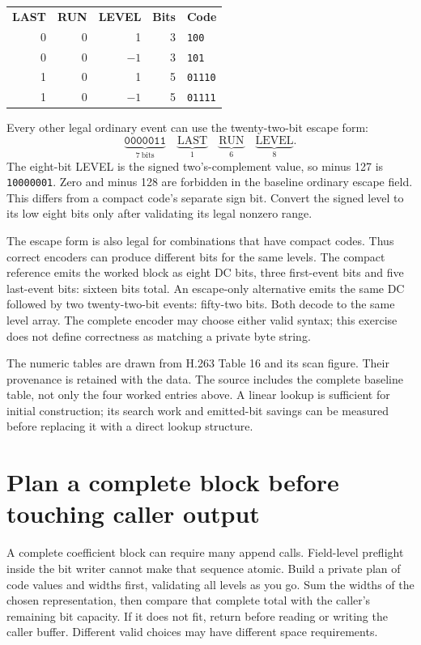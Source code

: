 \begin{center}
\begin{tabular}{rrrrl}
\textbf{LAST} & \textbf{RUN} & \textbf{LEVEL} & \textbf{Bits} & \textbf{Code}\\
0 & 0 & 1 & 3 & \texttt{100}\\
0 & 0 & $-1$ & 3 & \texttt{101}\\
1 & 0 & 1 & 5 & \texttt{01110}\\
1 & 0 & $-1$ & 5 & \texttt{01111}
\end{tabular}
\end{center}
Every other legal ordinary event can use the twenty-two-bit escape form:
\[
 \underbrace{\texttt{0000011}}_{7\ \mathrm{bits}}\quad
 \underbrace{\mathrm{LAST}}_{1}\quad
 \underbrace{\mathrm{RUN}}_{6}\quad
 \underbrace{\mathrm{LEVEL}}_{8}.
\]
The eight-bit LEVEL is the signed two's-complement value, so minus 127 is
\texttt{10000001}. Zero and minus 128 are forbidden in the baseline ordinary
escape field. This differs from a compact code's separate sign bit. Convert the
signed level to its low eight bits only after validating its legal nonzero range.

The escape form is also legal for combinations that have compact codes. Thus
correct encoders can produce different bits for the same levels. The compact
reference emits the worked block as eight DC bits, three first-event bits and
five last-event bits: sixteen bits total. An escape-only alternative emits the
same DC followed by two twenty-two-bit events: fifty-two bits. Both decode to
the same level array. The complete encoder may choose either valid syntax;
this exercise does not define correctness as matching a private byte string.

The numeric tables are drawn from H.263 Table 16 and its scan figure. Their
provenance is retained with the data. The source includes the complete baseline
table, not only the four worked entries above. A linear lookup is sufficient for
initial construction; its search work and emitted-bit savings can be measured
before replacing it with a direct lookup structure.

\section{Plan a complete block before touching caller output}
A complete coefficient block can require many append calls. Field-level preflight
inside the bit writer cannot make that sequence atomic. Build a private plan of
code values and widths first, validating all levels as you go. Sum the widths of
the chosen representation, then compare that complete total with the caller's
remaining bit capacity. If it does not fit, return before reading or writing the
caller buffer. Different valid choices may have different space requirements.

